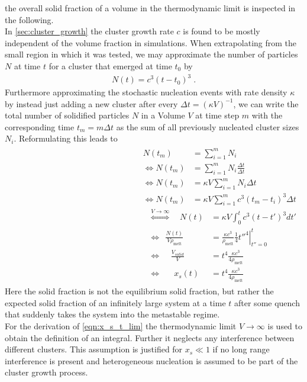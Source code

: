  the overall solid fraction of a volume in the thermodynamic limit is inspected in the following.\\

In \autoref{sec:cluster_growth} the cluster growth rate $c$ is found to be mostly independent of the volume fraction in simulations. When extrapolating from the small region in which it was tested, we may approximate the number of particles $N$ at time $t$ for a cluster that emerged at time $t_0$ by
\begin{align}
\label{eqn:simple_growth}
N(t) = c^3 (t-t_0)^3 \; \text{.}
\end{align} 
Furthermore approximating the stochastic nucleation events with rate density $\kappa$ by instead just adding a new cluster after every $\Delta t = (\kappa V)^{-1}$, we can write the total number of solidified particles $N$ in a Volume $V$ at time step $m$ with the corresponding time $t_m = m \Delta t$ as the sum of all previously nucleated cluster sizes $N_i$. Reformulating this leads to
\begin{align}
\begin{split}
N(t_m)&=\sum_{i=1}^m N_i\\
\Leftrightarrow N(t_m)&=\sum_{i=1}^m N_i \frac{\Delta t}{\Delta t}\\
\Leftrightarrow N(t_m)&=\kappa V \sum_{i=1}^m N_i \Delta t\\
\Leftrightarrow N(t_m)&=\kappa V \sum_{i=1}^m c^3 (t_m-t_i)^3 \Delta t
\end{split}
\begin{split}
\label{eqn:x_s_t_lim}
\stackrel{V \rightarrow \infty } {\Leftrightarrow} \quad N(t)&=\kappa V \int_0^{t} c^3 (t - t')^3 d t'\\
\Leftrightarrow \; \, \frac{N(t)}{V \rho_{\text{melt}}}&=\frac{\kappa c^3}{\rho_{\text{melt}}} \left. \frac{1}{4}t''^4 \right|_{t''=0}^t\\
\Leftrightarrow \; \; \; \; \frac{V_{solid}}{V} &= t^4 \frac{\kappa c^3}{4 \rho_{\text{melt}}}\\
\Leftrightarrow \quad \; \: x_s(t)&= t^4 \frac{\kappa c^3}{4 \rho_{\text{melt}}}
\end{split}
\end{align}
Here the solid fraction is not the equilibrium solid fraction, but rather the expected solid fraction of an infinitely large system at a time $t$ after some quench that suddenly takes the system into the metastable regime.\\ 
For the derivation of \autoref{eqn:x_s_t_lim} the thermodynamic limit $V\rightarrow \infty$ is used to obtain the definition of an integral. Further it neglects any interference between different clusters. This assumption is justified for $x_s \ll 1$ if no long range interference is present and heterogeneous nucleation is assumed to be part of the cluster growth process.\\

